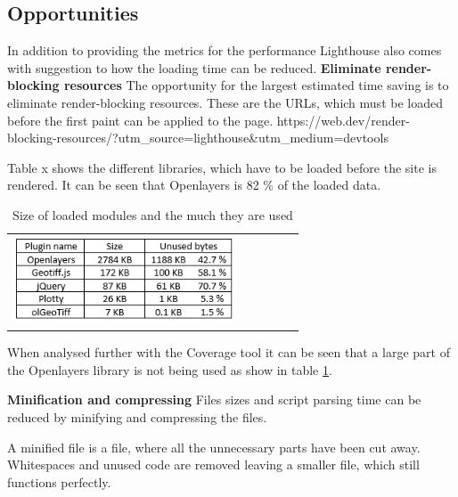 
\subsection{Opportunities}
In addition to providing the metrics for the performance Lighthouse also comes with suggestion to how the loading time can be reduced. 
\textbf{Eliminate render-blocking resources}
The opportunity for the largest estimated time saving is to eliminate render-blocking resources. These are the URLs, which must be loaded before the first paint can be applied to the page. 
https://web.dev/render-blocking-resources/?utm_source=lighthouse&utm_medium=devtools

Table x shows the different libraries, which have to be loaded before the site is rendered. It can be seen that Openlayers is 82 \% of the loaded data.

\begin{table}[htbp]
	\centering
	\begin{tabular}{l}
		\includegraphics[width=0.8\textwidth]{Pictures/tabPluginSize}
	\end{tabular}
	\caption{Size of loaded modules and the much they are used}
	\label{tabPluginSize}
\end{table}

When analysed further with the Coverage tool it can be seen that a large part of the Openlayers library is not being used as show in table \ref{tabPluginSize}.  


\textbf{Minification and compressing}
Files sizes and script parsing time can be reduced by minifying and compressing the files. 

A minified file is a file, where all the unnecessary parts have been cut away. Whitespaces and unused code are removed leaving a smaller file, which still functions perfectly. 


